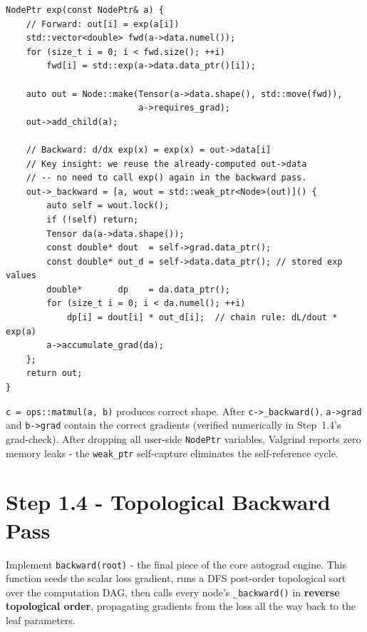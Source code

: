 \documentclass[12pt, a4paper]{article}
\begin{document}
\begin{lstlisting}[caption={\texttt{exp} - reuses forward output in backward}]
NodePtr exp(const NodePtr& a) {
    // Forward: out[i] = exp(a[i])
    std::vector<double> fwd(a->data.numel());
    for (size_t i = 0; i < fwd.size(); ++i)
        fwd[i] = std::exp(a->data.data_ptr()[i]);

    auto out = Node::make(Tensor(a->data.shape(), std::move(fwd)),
                          a->requires_grad);
    out->add_child(a);

    // Backward: d/dx exp(x) = exp(x) = out->data[i]
    // Key insight: we reuse the already-computed out->data
    // -- no need to call exp() again in the backward pass.
    out->_backward = [a, wout = std::weak_ptr<Node>(out)]() {
        auto self = wout.lock();
        if (!self) return;
        Tensor da(a->data.shape());
        const double* dout  = self->grad.data_ptr();
        const double* out_d = self->data.data_ptr(); // stored exp values
        double*       dp    = da.data_ptr();
        for (size_t i = 0; i < da.numel(); ++i)
            dp[i] = dout[i] * out_d[i];  // chain rule: dL/dout * exp(a)
        a->accumulate_grad(da);
    };
    return out;
}
\end{lstlisting}

\begin{tcolorbox}[exitbox, title={Step 1.3 - Exit Criterion (met)}]
  \texttt{c = ops::matmul(a, b)} produces correct shape.
  After \texttt{c->\_backward()}, \texttt{a->grad} and \texttt{b->grad} contain
  the correct gradients (verified numerically in Step~1.4's grad-check).
  After dropping all user-side \texttt{NodePtr} variables, Valgrind reports
  zero memory leaks - the \texttt{weak\_ptr} self-capture eliminates the
  self-reference cycle.
\end{tcolorbox}

\section{Step 1.4 - Topological Backward Pass}

\begin{tcolorbox}[designbox, title={Step 1.4 Goal}]
  Implement \texttt{backward(root)} - the final piece of the core autograd
  engine.  This function seeds the scalar loss gradient, runs a DFS
  post-order topological sort over the computation DAG, then calls every
  node's \texttt{\_backward()} in \textbf{reverse topological order},
  propagating gradients from the loss all the way back to the leaf parameters.
\end{tcolorbox}
\end{document}

